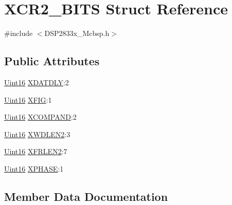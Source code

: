 \hypertarget{struct_x_c_r2___b_i_t_s}{}\section{X\+C\+R2\+\_\+\+B\+I\+T\+S Struct Reference}
\label{struct_x_c_r2___b_i_t_s}


{\ttfamily \#include $<$D\+S\+P2833x\+\_\+\+Mcbsp.\+h$>$}

\subsection*{Public Attributes}
\begin{DoxyCompactItemize}
\item 
\hyperlink{_d_s_p2833x___device_8h_a59a9f6be4562c327cbfb4f7e8e18f08b}{Uint16} \hyperlink{struct_x_c_r2___b_i_t_s_ae255e345525325b6d66d2fea105cc9e1}{X\+D\+A\+T\+D\+L\+Y}\+:2
\item 
\hyperlink{_d_s_p2833x___device_8h_a59a9f6be4562c327cbfb4f7e8e18f08b}{Uint16} \hyperlink{struct_x_c_r2___b_i_t_s_ae1f4788f78e09a01289a5a3ae30feecc}{X\+F\+I\+G}\+:1
\item 
\hyperlink{_d_s_p2833x___device_8h_a59a9f6be4562c327cbfb4f7e8e18f08b}{Uint16} \hyperlink{struct_x_c_r2___b_i_t_s_ae6f97ebef71d559bdd3d62fc8f0dcdb2}{X\+C\+O\+M\+P\+A\+N\+D}\+:2
\item 
\hyperlink{_d_s_p2833x___device_8h_a59a9f6be4562c327cbfb4f7e8e18f08b}{Uint16} \hyperlink{struct_x_c_r2___b_i_t_s_a82628dce351282470a0b25242de91783}{X\+W\+D\+L\+E\+N2}\+:3
\item 
\hyperlink{_d_s_p2833x___device_8h_a59a9f6be4562c327cbfb4f7e8e18f08b}{Uint16} \hyperlink{struct_x_c_r2___b_i_t_s_a906120263bf66f58a8dc696ed755b386}{X\+F\+R\+L\+E\+N2}\+:7
\item 
\hyperlink{_d_s_p2833x___device_8h_a59a9f6be4562c327cbfb4f7e8e18f08b}{Uint16} \hyperlink{struct_x_c_r2___b_i_t_s_a4b82ae3ac2e4c94f13509edcff8d2fb9}{X\+P\+H\+A\+S\+E}\+:1
\end{DoxyCompactItemize}


\subsection{Member Data Documentation}
\hypertarget{struct_x_c_r2___b_i_t_s_ae6f97ebef71d559bdd3d62fc8f0dcdb2}{}

